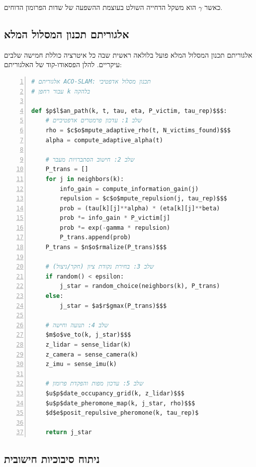 כאשר $\gamma$ הוא משקל הדחייה השולט בעוצמת ההשפעה של שדות הפרומון הדוחים.

\subsection{אלגוריתם תכנון המסלול המלא}
\label{sec:ch06_full_algorithm}

אלגוריתם תכנון המסלול המלא פועל בלולאה ראשית שבה כל איטרציה כוללת חמישה שלבים עיקריים. להלן הפסאודו-קוד של האלגוריתם:

\begin{english}
\begin{lstlisting}[language=Python, caption=אלגוריתם תכנון מסלול אדפטיבי \en{ACO-SLAM}, label=lst:ch06_algorithm, basicstyle=\small\ttfamily, numbers=left, numberstyle=\tiny, frame=single, breaklines=true]
# אלגוריתם ACO-SLAM: תכנון מסלול אדפטיבי
# עבור רחפן k בלהקה

def $p$l$an_path(k, t, tau, eta, P_victim, tau_rep)$$$:
    # שלב 1: עדכון פרמטרים אדפטיביים
    rho = $c$o$mpute_adaptive_rho(t, N_victims_found)$$$
    alpha = compute_adaptive_alpha(t)
    
    # שלב 2: חישוב הסתברויות מעבר
    P_trans = []
    for j in neighbors(k):
        info_gain = compute_information_gain(j)
        repulsion = $c$o$mpute_repulsion(j, tau_rep)$$$
        prob = (tau[k][j]**alpha) * (eta[k][j]**beta)
        prob *= info_gain * P_victim[j]
        prob *= exp(-gamma * repulsion)
        P_trans.append(prob)
    P_trans = $n$o$rmalize(P_trans)$$$
    
    # שלב 3: בחירת נקודת ציון (חקר/ניצול)
    if random() < epsilon:
        j_star = random_choice(neighbors(k), P_trans)
    else:
        j_star = $a$r$gmax(P_trans)$$$
    
    # שלב 4: תנועה וחישה
    $m$o$ve_to(k, j_star)$$$
    z_lidar = sense_lidar(k)
    z_camera = sense_camera(k)
    z_imu = sense_imu(k)
    
    # שלב 5: עדכון מפות והפקדת פרומון
    $u$p$date_occupancy_grid(k, z_lidar)$$$
    $u$p$date_pheromone_map(k, j_star, rho)$$$
    $d$e$posit_repulsive_pheromone(k, tau_rep)$ 
    
    return j_star
\end{lstlisting}
\end{english}

\subsection{ניתוח סיבוכיות חישובית}
\label{sec:ch06_complexity}

